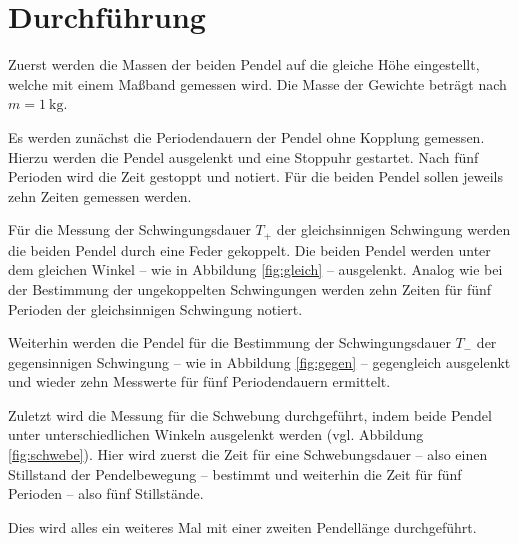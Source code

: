 \section{Durchführung}
\FloatBarrier
\label{sec:Durchführung}
Zuerst werden die Massen der beiden Pendel auf die gleiche Höhe eingestellt, welche mit 
einem Maßband gemessen wird. Die Masse der Gewichte beträgt nach \cite{Anleitung}
$m = \SI{1}{\kilo\gram}$. 

Es werden zunächst die Periodendauern der Pendel ohne Kopplung gemessen.
Hierzu werden die Pendel ausgelenkt und eine Stoppuhr gestartet.
Nach fünf Perioden wird die Zeit gestoppt und notiert.
Für die beiden Pendel sollen jeweils zehn Zeiten gemessen werden.

Für die Messung der Schwingungsdauer $T_+$ der gleichsinnigen Schwingung werden die beiden 
Pendel durch eine Feder gekoppelt. Die beiden Pendel werden unter dem gleichen 
Winkel -- wie in Abbildung \ref{fig:gleich} -- ausgelenkt. Analog 
wie bei der Bestimmung der ungekoppelten Schwingungen werden zehn Zeiten für fünf
Perioden der gleichsinnigen Schwingung notiert.

Weiterhin werden die Pendel für die Bestimmung der Schwingungsdauer $T_-$ der gegensinnigen 
Schwingung -- wie in Abbildung \ref{fig:gegen} -- gegengleich ausgelenkt und wieder zehn 
Messwerte für fünf Periodendauern ermittelt.

Zuletzt wird die Messung für die Schwebung durchgeführt, indem beide Pendel unter 
unterschiedlichen Winkeln ausgelenkt werden (vgl. Abbildung \ref{fig:schwebe}).
Hier wird zuerst die Zeit für eine Schwebungsdauer -- also einen Stillstand der 
Pendelbewegung -- bestimmt und weiterhin die Zeit für fünf Perioden -- also 
fünf Stillstände.

Dies wird alles ein weiteres Mal mit einer zweiten Pendellänge durchgeführt.
